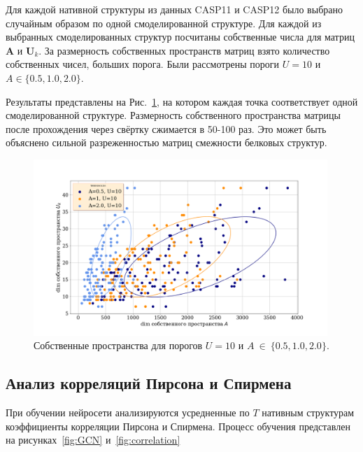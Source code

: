 \documentclass[14pt]{extarticle}
\begin{document}
Для каждой нативной структуры из данных CASP11 и CASP12 было выбрано случайным образом по одной смоделированной структуре. Для каждой из выбранных смоделированных структур посчитаны собственные числа для матриц $\textbf{A}$ и $\textbf{U}_k$. За размерность собственных пространств матриц взято количество собственных чисел, больших порога. Были рассмотрены пороги $U=10$ и $A \in \{0.5, 1.0, 2.0\}$. 

Результаты представлены на Рис.~\ref{eigens_dims}, на котором каждая точка соответствует одной смоделированной структуре. Размерность собственного пространства матрицы после прохождения через свёртку сжимается в 50-100 раз. Это может быть объяснено сильной разреженностью матриц смежности белковых структур.

\begin{figure}[H]
	\centering
	\includegraphics[width=0.99\textwidth]{eigens.png}
	\caption{Собственные пространства для порогов $U=10$ и $A~\in~\{0.5, 1.0, 2.0\}$.}
	\label{eigens_dims}
\end{figure}


\subsection{Анализ корреляций Пирсона и Спирмена}
При обучении нейросети анализируются усредненные по $T$ нативным структурам коэффициенты корреляции Пирсона и Спирмена. Процесс обучения представлен на рисунках~\ref{fig:GCN} и~\ref{fig:correlation}

\end{document}
